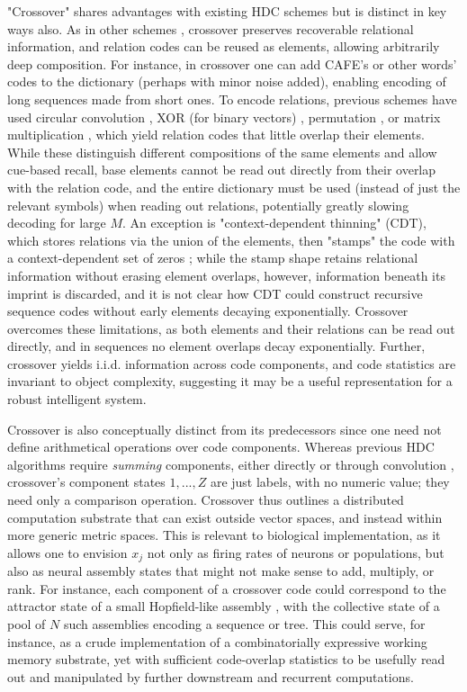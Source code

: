 \documentclass{article}
\begin{document}
"Crossover" shares advantages with existing HDC schemes but is distinct in key ways also. As in other schemes \cite{Kanerva:2009}, crossover preserves recoverable relational information, and relation codes can be reused as elements, allowing arbitrarily deep composition. For instance, in crossover one can add CAFE's or other words' codes to the dictionary (perhaps with minor noise added), enabling encoding of long sequences made from short ones. To encode relations, previous schemes have used circular convolution \cite{Plate:1995}, XOR (for binary vectors) \cite{Kanerva:1994}, permutation \cite{Sahlgren:2008, Gayler:1998}, or matrix multiplication \cite{Gosmann:2019}, which yield relation codes that little overlap their elements. While these distinguish different compositions of the same elements and allow cue-based recall, base elements cannot be read out directly from their overlap with the relation code, and the entire dictionary must be used (instead of just the relevant symbols) when reading out relations, potentially greatly slowing decoding for large $M$. An exception is "context-dependent thinning" (CDT), which stores relations via the union of the elements, then "stamps" the code with a context-dependent set of zeros \cite{Rachkovskij:2001}; while the stamp shape retains relational information without erasing element overlaps, however, information beneath its imprint is discarded, and it is not clear how CDT could construct recursive sequence codes without early elements decaying exponentially. Crossover overcomes these limitations, as both elements and their relations can be read out directly, and in sequences no element overlaps decay exponentially. Further, crossover yields i.i.d. information across code components, and code statistics are invariant to object complexity, suggesting it may be a useful representation for a robust intelligent system.

Crossover is also conceptually distinct from its predecessors since one need not define arithmetical operations over code components. Whereas previous HDC algorithms require \textit{summing} components, either directly or through convolution \cite{Plate:1995, Gayler:1998, Sahlgren:2008, Gosmann:2019, Rachkovskij:2001, Kanerva:1994}, crossover's component states $1, ..., Z$ are just labels, with no numeric value; they need only a comparison operation. Crossover thus outlines a distributed computation substrate that can exist outside vector spaces, and instead within more generic metric spaces. This is relevant to biological implementation, as it allows one to envision $x_j$ not only as firing rates of neurons or populations, but also as neural assembly states that might not make sense to add, multiply, or rank. For instance, each component of a crossover code could correspond to the attractor state of a small Hopfield-like assembly \cite{Hopfield:1982}, with the collective state of a pool of $N$ such assemblies encoding a sequence or tree. This could serve, for instance, as a crude implementation of a combinatorially expressive working memory substrate, yet with sufficient code-overlap statistics to be usefully read out and manipulated by further downstream and recurrent computations.
\end{document}
